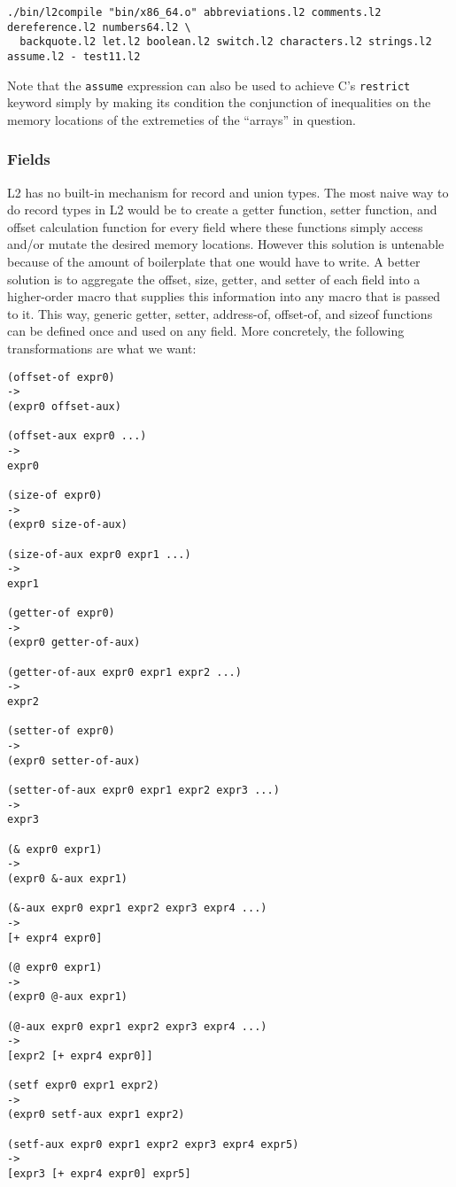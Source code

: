 \documentclass[]{article}
\begin{document}
\begin{verbatim}
./bin/l2compile "bin/x86_64.o" abbreviations.l2 comments.l2 dereference.l2 numbers64.l2 \
  backquote.l2 let.l2 boolean.l2 switch.l2 characters.l2 strings.l2 assume.l2 - test11.l2
\end{verbatim}

Note that the \texttt{assume} expression can also be used to achieve C's
\texttt{restrict} keyword simply by making its condition the conjunction
of inequalities on the memory locations of the extremeties of the
``arrays'' in question.

\hypertarget{fields}{\subsubsection{Fields}\label{fields}}

L2 has no built-in mechanism for record and union types. The most naive
way to do record types in L2 would be to create a getter function,
setter function, and offset calculation function for every field where
these functions simply access and/or mutate the desired memory
locations. However this solution is untenable because of the amount of
boilerplate that one would have to write. A better solution is to
aggregate the offset, size, getter, and setter of each field into a
higher-order macro that supplies this information into any macro that is
passed to it. This way, generic getter, setter, address-of, offset-of,
and sizeof functions can be defined once and used on any field. More
concretely, the following transformations are what we want:

\begin{verbatim}
(offset-of expr0)
->
(expr0 offset-aux)

(offset-aux expr0 ...)
->
expr0

(size-of expr0)
->
(expr0 size-of-aux)

(size-of-aux expr0 expr1 ...)
->
expr1

(getter-of expr0)
->
(expr0 getter-of-aux)

(getter-of-aux expr0 expr1 expr2 ...)
->
expr2

(setter-of expr0)
->
(expr0 setter-of-aux)

(setter-of-aux expr0 expr1 expr2 expr3 ...)
->
expr3

(& expr0 expr1)
->
(expr0 &-aux expr1)

(&-aux expr0 expr1 expr2 expr3 expr4 ...)
->
[+ expr4 expr0]

(@ expr0 expr1)
->
(expr0 @-aux expr1)

(@-aux expr0 expr1 expr2 expr3 expr4 ...)
->
[expr2 [+ expr4 expr0]]

(setf expr0 expr1 expr2)
->
(expr0 setf-aux expr1 expr2)

(setf-aux expr0 expr1 expr2 expr3 expr4 expr5)
->
[expr3 [+ expr4 expr0] expr5]
\end{verbatim}
\end{document}
